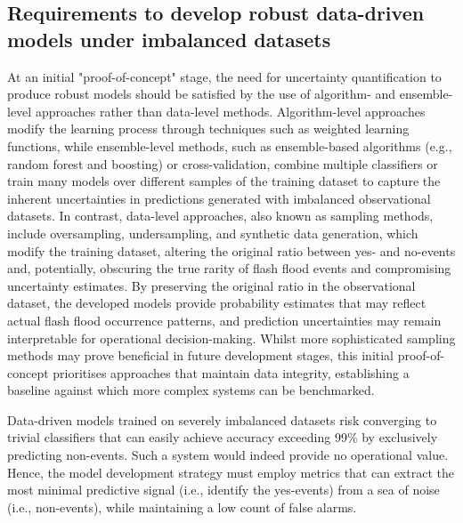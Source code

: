\subsection{Requirements to develop robust data-driven models under imbalanced datasets}

At  an initial "proof-of-concept" stage, the need for uncertainty quantification to produce robust models should be satisfied by the use of algorithm- and ensemble-level approaches rather than data-level methods. Algorithm-level approaches modify the learning process through techniques such as weighted learning functions, while ensemble-level methods, such as ensemble-based algorithms (e.g., random forest and boosting) or cross-validation, combine multiple classifiers or train many models over different samples of the training dataset to capture the inherent uncertainties in predictions generated with imbalanced observational datasets. In contrast, data-level approaches, also known as sampling methods, include oversampling, undersampling, and synthetic data generation, which modify the training dataset, altering the original ratio between yes- and no-events and, potentially, obscuring the true rarity of flash flood events and compromising uncertainty estimates. By preserving the original ratio in the observational dataset, the developed models provide probability estimates that may reflect actual flash flood occurrence patterns, and prediction uncertainties may remain interpretable for operational decision-making. Whilst more sophisticated sampling methods may prove beneficial in future development stages, this initial proof-of-concept prioritises approaches that maintain data integrity, establishing a baseline against which more complex systems can be benchmarked.

Data-driven  models trained on severely imbalanced datasets risk converging to trivial classifiers that can easily achieve accuracy exceeding 99\% by exclusively predicting non-events. Such a system would indeed provide no operational value. Hence, the model development strategy must employ metrics that can extract the most minimal predictive signal (i.e., identify the yes-events) from a sea of noise (i.e., non-events), while maintaining a low count of false alarms.

